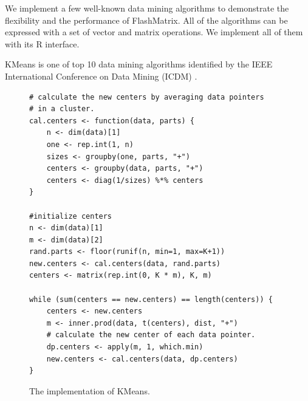 We implement a few well-known data mining algorithms to demonstrate
the flexibility and the performance of FlashMatrix. All of the algorithms
can be expressed with a set of vector and matrix operations. We implement
all of them with its R interface.

KMeans is one of top 10 data mining algorithms identified by the IEEE
International Conference on Data Mining (ICDM) \cite{top10}.

\begin{figure}[t]
\begin{verbatim}
# calculate the new centers by averaging data pointers
# in a cluster.
cal.centers <- function(data, parts) {
	n <- dim(data)[1]
	one <- rep.int(1, n)
	sizes <- groupby(one, parts, "+")
	centers <- groupby(data, parts, "+")
	centers <- diag(1/sizes) %*% centers
}

#initialize centers
n <- dim(data)[1]
m <- dim(data)[2]
rand.parts <- floor(runif(n, min=1, max=K+1))
new.centers <- cal.centers(data, rand.parts)
centers <- matrix(rep.int(0, K * m), K, m)

while (sum(centers == new.centers) == length(centers)) {
	centers <- new.centers
	m <- inner.prod(data, t(centers), dist, "+")
	# calculate the new center of each data pointer.
	dp.centers <- apply(m, 1, which.min)
	new.centers <- cal.centers(data, dp.centers)
}
\end{verbatim}
\vspace{-5pt}
\caption{The implementation of KMeans.}
\label{fig:kmeans}
\end{figure}

